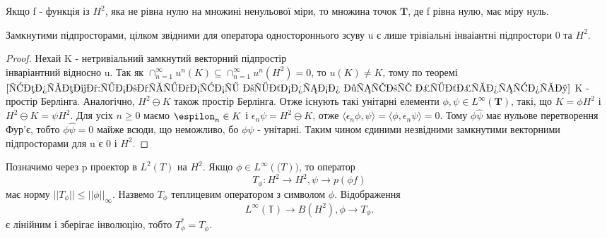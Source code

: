\begin{corollary}
    Якщо f - функція із $H^2$, яка не рівна нулю на множині ненульової міри, то
    множина точок $\mathbf{T}$, де f рівна нулю, має міру нуль.
\end{corollary}

\begin{theorem}
    Замкнутими підпросторами, цілком звідними для оператора одностороннього зсуву u
    є лише трівіальні інваіантні підпростори 0 та $H^2$.
    \begin{proof}
        Нехай K - нетривіальний замкнутий векторний підпростір \\ інваріантний відносно u.
        Так як $\cap_{n=1}^{\infty} u^n(K) \subseteq \cap_{n=1}^\infty u^n(H^2) = 0$, то
        $u(K) \neq K$, тому по теоремі~$\ref{теорема:інваріантні відносно зсуву підпростори}$
        K - простір Берлінга.
        Аналогічно, $H^2 \ominus K$ також простір Берлінга.
        Отже існують такі унітарні елементи $\phi, \psi \in L^\infty(\mathbf{T})$, такі, що
        $K = \phi H^2$ і $H^2 \ominus K = \psi H^2$.
        Для усіх $n \geq 0$ маємо $\espilon_n \in K$ і $\epsilon_n \psi = H^2 \ominus K$,
        отже $\langle \epsilon_n \phi, \psi \rangle = \langle \phi, \epsilon_n \psi \rangle = 0$.
        Тому $\phi \hat{\psi}$ має нульове перетворення Фур'є, тобто $\phi \hat{\psi} = 0$ майже всюди,
        що неможливо, бо $\phi \psi$ - унітарні.
        Таким чином єдиними незвідними замкнутими векторними підпросторами для u є $0$ і $H^2$.
    \end{proof}
\end{theorem}

Позначимо через p проектор в $L^2(T)$ на $H^2$.
Якщо $\phi \in L^{\infty}(\mathbf(T))$, то оператор
\begin{equation*}
    T_\phi: H^2 \to H^2, \psi \to p(\phi f)
\end{equation*}
має норму $||T_\phi|| \leq ||\phi||_\infty$.
Назвемо $T_\phi$ теплицевим оператором з символом $\phi$.
Відображення
\begin{equation*}
    L^\infty(\mathbb{T}) \to B(H^2), \phi \to T_\phi.
\end{equation*}
є лінійним і зберігає інволюцію, тобто $T^*_\phi = T_\bar{\phi}$.

